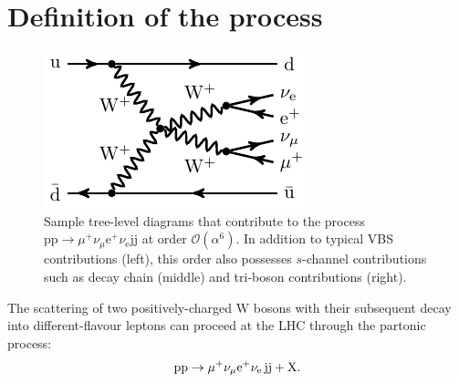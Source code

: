 \documentclass[twocolumn,epjc3]{svjour3} %
\newcommand{\Pj}{\ensuremath{\text{j}}\xspace}
\newcommand{\Pp}{\ensuremath{\text{p}}\xspace}
\newcommand{\Pe}{\ensuremath{\text{e}}\xspace}
\newcommand{\PW}{\ensuremath{\text{W}}\xspace}
\newlength{\width}
\begin{document}
\section{Definition of the process}
\label{sec:definition}
\begin{figure}
\begin{center}
          \includegraphics[width=0.30\linewidth]{feynman/LO_EW_5}
\end{center}
        \caption{Sample tree-level diagrams that contribute to the process $\Pp\Pp\to\mu^+\nu_\mu\Pe^+\nu_{\Pe}\Pj\Pj$ at order $\mathcal{O}{\left(\alpha^{6}\right)}$.
        In addition to typical VBS contributions (left), this order also possesses $s$-channel contributions such as decay chain (middle) and tri-boson contributions (right).}
\label{diag:LO}
\end{figure}

The scattering of two positively-charged $\PW$ bosons with their subsequent decay into different-flavour leptons 
can proceed at the LHC through the partonic process:
%
\begin{equation}
\Pp\Pp\to\mu^+\nu_\mu{\rm e}^+\nu_{\rm e}\,\Pj\Pj+\mathrm{X}.
\end{equation}
\end{document}
